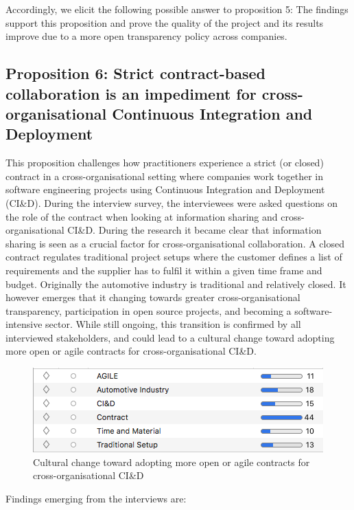 Accordingly, we elicit the following possible answer to proposition 5:
The findings support this proposition and prove the quality of the project and its results improve due to a more open transparency policy across companies.

\subsection{Proposition 6: Strict contract-based collaboration is an impediment for cross-organisational Continuous Integration and Deployment}

This proposition challenges how practitioners experience a strict (or closed) contract in a cross-organisational setting where companies work together in software engineering projects using Continuous Integration and Deployment (CI\&D). During the interview survey, the interviewees were asked questions on the role of the contract when looking at information sharing and cross-organisational CI\&D. During the research it became clear that information sharing is seen as a crucial factor for cross-organisational collaboration. A closed contract regulates traditional project setups where the customer defines a list of requirements and the supplier has to fulfil it within a given time frame and budget. Originally the automotive industry is traditional and relatively closed. It however emerges that it changing towards greater cross-organisational transparency, participation in open source projects, and becoming a software-intensive sector. While still ongoing, this transition is confirmed by all interviewed stakeholders, and could lead to a cultural change toward adopting more open or agile contracts for cross-organisational CI\&D.

\begin{figure}[htb]
\centering
\includegraphics[width=\columnwidth]{figure/ss_CodeGroup6.png}
\caption{Cultural change toward adopting more open or agile contracts for cross-organisational CI\&D}
\label{fig:towardsAgile}
\end{figure}


Findings emerging from the interviews are:

